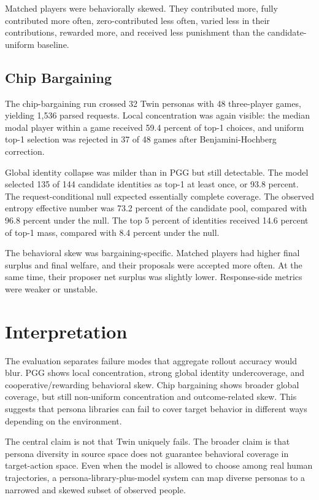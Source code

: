\documentclass[11pt]{article}
\begin{document}
Matched players were behaviorally skewed. They contributed more, fully contributed more often, zero-contributed less often, varied less in their contributions, rewarded more, and received less punishment than the candidate-uniform baseline.

\subsection{Chip Bargaining}

The chip-bargaining run crossed 32 Twin personas with 48 three-player games, yielding 1,536 parsed requests. Local concentration was again visible: the median modal player within a game received 59.4 percent of top-1 choices, and uniform top-1 selection was rejected in 37 of 48 games after Benjamini-Hochberg correction.

Global identity collapse was milder than in PGG but still detectable. The model selected 135 of 144 candidate identities as top-1 at least once, or 93.8 percent. The request-conditional null expected essentially complete coverage. The observed entropy effective number was 73.2 percent of the candidate pool, compared with 96.8 percent under the null. The top 5 percent of identities received 14.6 percent of top-1 mass, compared with 8.4 percent under the null.

The behavioral skew was bargaining-specific. Matched players had higher final surplus and final welfare, and their proposals were accepted more often. At the same time, their proposer net surplus was slightly lower. Response-side metrics were weaker or unstable.

\section{Interpretation}

The evaluation separates failure modes that aggregate rollout accuracy would blur. PGG shows local concentration, strong global identity undercoverage, and cooperative/rewarding behavioral skew. Chip bargaining shows broader global coverage, but still non-uniform concentration and outcome-related skew. This suggests that persona libraries can fail to cover target behavior in different ways depending on the environment.

The central claim is not that Twin uniquely fails. The broader claim is that persona diversity in source space does not guarantee behavioral coverage in target-action space. Even when the model is allowed to choose among real human trajectories, a persona-library-plus-model system can map diverse personas to a narrowed and skewed subset of observed people.
\end{document}
